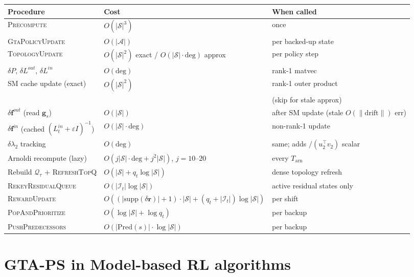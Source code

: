 \documentclass[10pt,a4paper]{article}
\begin{document}
\begin{center}
\begin{tabular}{lll}
\toprule
Procedure & Cost & When called \\
\midrule
\textsc{Precompute} & $O(|\mathcal{S}|^3)$ & once \\
\textsc{GtaPolicyUpdate} & $O(|\mathcal{A}|)$ & per backed-up state \\
\textsc{TopologyUpdate} & $O(|\mathcal{S}|^2)$ exact / $O(|\mathcal{S}|\cdot\mathrm{deg})$ approx & per policy step \\
\quad $\delta P$, $\delta L^{out}$, $\delta L^{in}$ & $O(\mathrm{deg})$ & rank-1 matvec\\
\quad SM cache update (exact) & $O(|\mathcal{S}|^2)$ & rank-1 outer product \\
\quad & & (skip for stale approx) \\
\quad $\delta\mathbf{f}^{out}$ (read $\mathbf{g}_s$) & $O(|\mathcal{S}|)$ & after SM update (stale $O(\|\mathrm{drift}\|)$ err) \\
\quad $\delta\mathbf{f}^{in}$ (cached $(L^{in}_t+\varepsilon I)^{-1}$) & $O(|\mathcal{S}|\cdot\mathrm{deg})$ & non-rank-1 update \\
\quad $\delta\lambda_2$ tracking & $O(\mathrm{deg})$ & same; adds $/(u_2^\top v_2)$ scalar \\
\quad Arnoldi recompute (lazy) & $O(j|\mathcal{S}|\cdot\mathrm{deg}+j^2|\mathcal{S}|)$, $j\!=\!10$--$20$ & every $T_{\mathrm{arn}}$ \\
\quad Rebuild $\mathcal{Q}_{\tau}$ $+$ \textsc{RefreshTopQ} & $O(|\mathcal{S}| + q_t\log|\mathcal{S}|)$ & dense topology refresh \\
\quad \textsc{RekeyResidualQueue} & $O(|\mathcal{I}_t|\log|\mathcal{S}|)$ & active residual states only \\
\textsc{RewardUpdate} & $O((|\mathrm{supp}(\delta\mathbf{r})| + 1)\cdot|\mathcal{S}| + (q_t + |\mathcal{I}_t|)\log|\mathcal{S}|)$ & per shift\\
\textsc{PopAndPrioritize} & $O(\log|\mathcal{S}| + \log q_t)$ & per backup \\
\textsc{PushPredecessors} & $O(|\mathrm{Pred}(s)|\cdot\log|\mathcal{S}|)$ & per backup \\
\bottomrule
\end{tabular}
\end{center}




\section{GTA-PS in Model-based RL algorithms}
\end{document}
